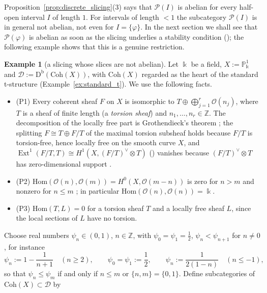\documentclass[12pt]{amsart}
\makeatletter
\newcommand{\condlabel}[2]{\phantomsection\def\@currentlabel{#1}\label{#2}\textup{(#1)}}
\numberwithin{theorem}{section}
\theoremstyle{definition}
\newtheorem{example}[theorem]{Example}
\newcommand{\D}{\mathrm{D}}
\newcommand{\ZZ}{\mathbb{Z}}
\newcommand{\calP}{\mathcal{P}}
\newcommand{\kk}{\Bbbk}
\newcommand{\Hom}{\mathrm{Hom}}
\newcommand{\projective}{\mathbb{P}}
\newcommand{\oo}{\mathscr{O}}
\newcommand{\Ext}{\operatorname{Ext}}
\newcommand{\calD}{\mathcal{D}}
\makeatother
\begin{document}
	Proposition~\ref{prop:discrete_slicing}(3) says that $\calP(I)$ is abelian for every half-open interval $I$ of length $1$.
	For intervals of length $< 1$ the subcategory $\calP(I)$ is in general not abelian, not even for $I = \{ \varphi \}$.
	In the next section we shall see that $\calP(\varphi)$ is abelian as soon as the slicing underlies a stability condition (\cite[Lemma~5.2]{Bri07});
	the following example shows that this is a genuine restriction.

	\begin{example}[a slicing whose slices are not abelian]
		\label{ex:P1_slicing}
		Let $\kk$ be a field, $X := \projective^1_{\kk}$ and $\calD := \D^{\mathrm{b}}(\mathrm{Coh}(X))$, with $\mathrm{Coh}(X)$ regarded as the heart of the standard t-structure (Example~\ref{ex:standard_t}).
		We use the following facts.
		\begin{itemize}
			\item[] \condlabel{P1}{cond:P1} Every coherent sheaf $F$ on $X$ is isomorphic to $T \oplus \bigoplus_{j=1}^{r} \oo(n_j)$, where $T$ is a sheaf of finite length (a \emph{torsion sheaf}) and $n_1, \ldots, n_r \in \ZZ$.
			The decomposition of the locally free part is Grothendieck's theorem \cite{HM82};
			the splitting $F \cong T \oplus F / T$ of the maximal torsion subsheaf holds because $F / T$ is torsion-free, hence locally free on the smooth curve $X$, and $\Ext^1(F / T, T) \cong H^1(X, (F / T)^{\vee} \otimes T)$ (\cite[Props.~III.6.3 and III.6.7]{Har77}) vanishes because $(F / T)^{\vee} \otimes T$ has zero-dimensional support \cite[Thm~III.2.7]{Har77}.
			\item[] \condlabel{P2}{cond:P2} $\Hom(\oo(n), \oo(m)) = H^0(X, \oo(m - n))$ is zero for $n > m$ and nonzero for $n \leqslant m$ \cite[Thm~III.5.1]{Har77}; in particular $\Hom(\oo(n), \oo(n)) = \kk$.
			\item[] \condlabel{P3}{cond:P3} $\Hom(T, L) = 0$ for a torsion sheaf $T$ and a locally free sheaf $L$, since the local sections of $L$ have no torsion.
		\end{itemize}
		Choose real numbers $\psi_n \in (0, 1)$, $n \in \ZZ$, with $\psi_0 = \psi_1 = \tfrac12$, $\psi_n < \psi_{n+1}$ for $n \neq 0$, for instance
		\[
		\psi_n := 1 - \frac{1}{n + 1} \quad (n \geqslant 2), \qquad \psi_0 = \psi_1 := \frac12, \qquad \psi_n := \frac{1}{2 (1 - n)} \quad (n \leqslant -1) ,
		\]
		so that $\psi_n \leqslant \psi_m$ if and only if $n \leqslant m$ or $\{ n, m \} = \{ 0, 1 \}$.
		Define subcategories of $\mathrm{Coh}(X) \subset \calD$ by
		\begin{align*}

\end{align*}
\end{example}
\end{document}
